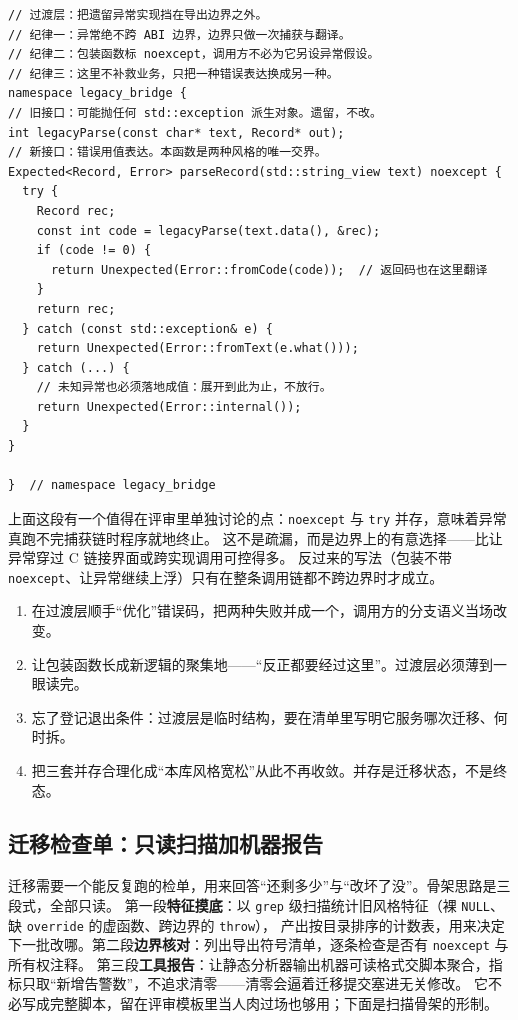 \documentclass[12pt,a4paper,fontset=fandol]{ctexbook}
\newcommand{\Tp}[1]{\texttt{#1}}
\newcommand{\Lang}[1]{\textsf{#1}}
\begin{document}
\begin{lstlisting}[style=cppstyle]
// 过渡层：把遗留异常实现挡在导出边界之外。
// 纪律一：异常绝不跨 ABI 边界，边界只做一次捕获与翻译。
// 纪律二：包装函数标 noexcept，调用方不必为它另设异常假设。
// 纪律三：这里不补救业务，只把一种错误表达换成另一种。
namespace legacy_bridge {
// 旧接口：可能抛任何 std::exception 派生对象。遗留，不改。
int legacyParse(const char* text, Record* out);
// 新接口：错误用值表达。本函数是两种风格的唯一交界。
Expected<Record, Error> parseRecord(std::string_view text) noexcept {
  try {
    Record rec;
    const int code = legacyParse(text.data(), &rec);
    if (code != 0) {
      return Unexpected(Error::fromCode(code));  // 返回码也在这里翻译
    }
    return rec;
  } catch (const std::exception& e) {
    return Unexpected(Error::fromText(e.what()));
  } catch (...) {
    // 未知异常也必须落地成值：展开到此为止，不放行。
    return Unexpected(Error::internal());
  }
}

}  // namespace legacy_bridge
\end{lstlisting}

上面这段有一个值得在评审里单独讨论的点：\Tp{noexcept} 与 \Tp{try} 并存，意味着异常真跑不完捕获链时程序就地终止。
这不是疏漏，而是边界上的有意选择——比让异常穿过 \Lang{C} 链接界面或跨实现调用可控得多。
反过来的写法（包装不带 \Tp{noexcept}、让异常继续上浮）只有在整条调用链都不跨边界时才成立。

\begin{warning}[title={迁移期最容易犯的四个错}]
  \begin{enumerate}[label=\arabic*., leftmargin=2.6em]
    \item 在过渡层顺手``优化''错误码，把两种失败并成一个，调用方的分支语义当场改变。
    \item 让包装函数长成新逻辑的聚集地——``反正都要经过这里''。过渡层必须薄到一眼读完。
    \item 忘了登记退出条件：过渡层是临时结构，要在清单里写明它服务哪次迁移、何时拆。
    \item 把三套并存合理化成``本库风格宽松''从此不再收敛。并存是迁移状态，不是终态。
  \end{enumerate}
\end{warning}

\subsection{迁移检查单：只读扫描加机器报告}
\label{sec:ch14-checklist}

迁移需要一个能反复跑的检单，用来回答``还剩多少''与``改坏了没''。骨架思路是三段式，全部只读。
第一段\textbf{特征摸底}：以 \Tp{grep} 级扫描统计旧风格特征（裸 \Tp{NULL}、缺 \Tp{override} 的虚函数、跨边界的 \Tp{throw}），
产出按目录排序的计数表，用来决定下一批改哪。第二段\textbf{边界核对}：列出导出符号清单，逐条检查是否有 \Tp{noexcept} 与所有权注释。
第三段\textbf{工具报告}：让静态分析器输出机器可读格式交脚本聚合，指标只取``新增告警数''，不追求清零——清零会逼着迁移提交塞进无关修改。
它不必写成完整脚本，留在评审模板里当人肉过场也够用；下面是扫描骨架的形制。
\end{document}
